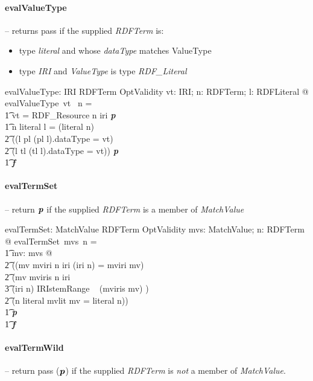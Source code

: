 \documentclass[fuzz]{llncs}
\def\entryFor{\cdot}
\def\pass{\textbf{\textit{p}}}
\def\fail{\textbf{\textit{f}}}
\def\zc{\textit}
\begin{document}
\paragraph{evalValueType} -- returns pass if the supplied \zc{RDFTerm} is:
\begin{itemize}
\item type \zc{literal} and whose \zc{dataType} matches ValueType
\item type \zc{IRI} and \zc{ValueType} is type \zc{RDF\_Literal}
\end{itemize}
\begin{gendef}
   evalValueType: IRI \pfun RDFTerm \pfun OptValidity
\where
   \forall vt: IRI; n: RDFTerm; l: RDFLiteral @ evalValueType~vt~ n = \\
\t1 \IF vt = RDF\_Resource \land  n \in \ran iri \THEN \pass \\
\t1 \ELSE \IF n \in \ran literal \land l = (literal \entryFor n) \land \\
\t2 ((l \in \ran pl \land (pl \entryFor l).dataType = vt) \lor \\
\t2  (l \in \ran tl \land (tl \entryFor l).dataType = vt)) \THEN \pass \\
\t1 \ELSE \fail
\end{gendef}

\paragraph{evalTermSet} -- return $\pass$ if the supplied \zc{RDFTerm} is a member of \zc{MatchValue}
\begin{gendef}
   evalTermSet: \power MatchValue \pfun RDFTerm \pfun OptValidity
\where
   \forall mvs: \power MatchValue; n: RDFTerm @ evalTermSet~mvs~n = \\
\t1	\IF \exists mv: mvs @ \\
\t2 ((mv \in \ran mviri \land n \in \ran iri \land (iri \entryFor n) = mviri \entryFor mv) \lor \\
\t2  (mv \in \ran mviris \land n \in \ran iri \land  \\
\t3 (iri \entryFor n) \in IRIstemRange ~ (mviris \entryFor mv) ) \lor \\
\t2  (n \in \ran literal \land mvlit \entryFor mv = literal \entryFor n)) \\
\t1 \THEN \pass \\
\t1 \ELSE \fail
\end{gendef}


\paragraph{evalTermWild} -- return pass ($\pass$) if the supplied \zc{RDFTerm} is \textit{not} a member of \zc{MatchValue}.
\end{document}
